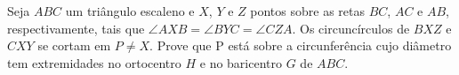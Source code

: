 Seja $ABC$ um triângulo escaleno e $X$, $Y$ e $Z$ pontos sobre as retas $BC$, $AC$ e $AB$, respectivamente, tais que $\angle AXB = \angle BYC = \angle CZA$.
Os circuncírculos de $BXZ$ e $CXY$ se cortam em $P \neq X$.
Prove que P está sobre a circunferência cujo diâmetro tem extremidades no ortocentro $H$ e no baricentro $G$ de $ABC$.